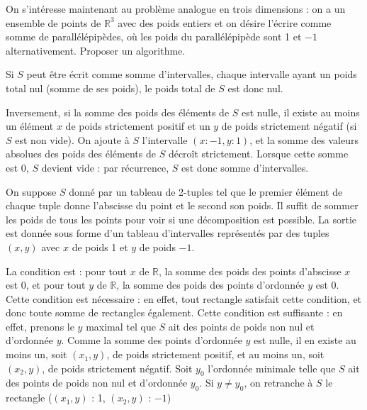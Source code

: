 \Q
On s'intéresse maintenant au problème analogue en trois dimensions : on a un ensemble de points de $\mathbb{R}^3$ avec des poids entiers et on désire l'écrire comme somme de parallélépipèdes, où les poids du parallélépipède sont 1 et $-1$ alternativement. Proposer un algorithme.

\Corrige

\Q
Si $S$ peut être écrit comme somme d'intervalles, chaque intervalle ayant un poids total nul (somme de ses poids), le poids total de $S$ est donc nul.
\medskip

Inversement, si la somme des poids des éléments de $S$ est nulle, il existe au moins un élément $x$ de poids strictement positif et un $y$ de poids strictement négatif (si $S$ est non vide). On ajoute à $S$ l'intervalle $(x:-1,y:1)$, et la somme des valeurs absolues des poids des éléments de $S$ décroît strictement. Lorsque cette somme est 0, $S$ devient vide : par récurrence, $S$ est donc somme d'intervalles.

\Q
On suppose $S$ donné par un tableau de 2-tuples tel que le premier élément de chaque tuple donne l'abscisse du point et le second son poids. Il suffit de sommer les poids de tous les points pour voir si une décomposition est possible. La sortie est donnée sous forme d'un tableau d'intervalles représentés par des tuples $(x,y)$ avec $x$ de poids 1 et $y$ de poids $-1$.



\Q
La condition est : pour tout $x$ de $\mathbb{R}$, la somme des poids des points d'abscisse $x$ est 0, et pour tout $y$ de $\mathbb{R}$, la somme des poids des points d'ordonnée $y$ est 0. Cette condition est nécessaire : en effet, tout rectangle satisfait cette condition, et donc toute somme de rectangles également. Cette condition est suffisante : en effet, prenons le $y$ maximal tel que $S$ ait des points de poids non nul et d'ordonnée $y$. Comme la somme des points d'ordonnée $y$ est nulle, il en existe au moins un, soit $(x_1,y)$, de poids strictement positif, et au moins un, soit $(x_2,y)$, de poids strictement négatif. Soit $y_0$ l'ordonnée minimale telle que $S$ ait des points de poids non nul et d'ordonnée $y_0$. Si $y \neq y_0$, on retranche à $S$ le rectangle ($(x_1,y)$ : 1, $(x_2,y)$ : $-1$)